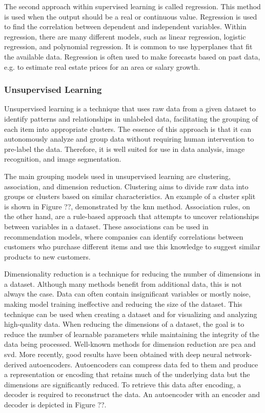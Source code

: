         The second approach within supervised learning is called regression. This method is used when the output should be a real or continuous value. Regression is used to find the correlation between dependent and independent variables. Within regression, there are many different models, such as linear regression, logistic regression, and polynomial regression. It is common to use hyperplanes that fit the available data. Regression is often used to make forecasts based on past data, e.g. to estimate real estate prices for an area or salary growth.


        \subsubsection{Unsupervised Learning}

        Unsupervised learning is a technique that uses raw data from a given dataset to identify patterns and relationships in unlabeled data, facilitating the grouping of each item into appropriate clusters. The essence of this approach is that it can autonomously analyze and group data without requiring human intervention to pre-label the data. Therefore, it is well suited for use in data analysis, image recognition, and image segmentation.
        
        The main grouping models used in unsupervised learning are clustering, association, and dimension reduction. Clustering aims to divide raw data into groups or clusters based on similar characteristics. An example of a cluster split is shown in Figure ??, demonstrated by the \gls{knn} method. Association rules, on the other hand, are a rule-based approach that attempts to uncover relationships between variables in a dataset. These associations can be used in recommendation models, where companies can identify correlations between customers who purchase different items and use this knowledge to suggest similar products to new customers.
        
        Dimensionality reduction is a technique for reducing the number of dimensions in a dataset. 
        Although many methods benefit from additional data, this is not always the case. Data can often contain insignificant variables or mostly noise, making model training ineffective and reducing the size of the dataset. This technique can be used when creating a dataset and for visualizing and analyzing high-quality data. When reducing the dimensions of a dataset, the goal is to reduce the number of learnable parameters while maintaining the integrity of the data being processed. Well-known methods for dimension reduction are \gls{pca} and \gls{svd}. More recently, good results have been obtained with deep neural network-derived autoencoders. Autoencoders can compress data fed to them and produce a representation or encoding that retains much of the underlying data but the dimensions are significantly reduced.
        To retrieve this data after encoding, a decoder is required to reconstruct the data. An autoencoder with an encoder and decoder is depicted in Figure ??.
        
